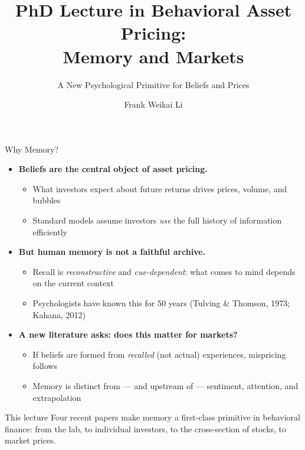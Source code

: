 \documentclass[aspectratio=169, 11pt]{beamer}
\title[EF8083 Lecture 6]{PhD Lecture in Behavioral Asset Pricing:\\ Memory and Markets}
\subtitle{A New Psychological Primitive for Beliefs and Prices}
\author[F.\ W.\ Li]{Frank Weikai Li}
\institute[CityU]{Associate Professor of Finance\\City University of Hong Kong}
\date{}
\begin{document}

\begin{frame}[plain]
\titlepage
\end{frame}

\begin{frame}{Why Memory?}
\begin{itemize}
\item \textbf{Beliefs are the central object of asset pricing.}
  \begin{itemize}
  \item What investors expect about future returns drives prices, volume, and bubbles
  \item Standard models assume investors \emph{use} the full history of information efficiently
  \end{itemize}
\item \textbf{But human memory is not a faithful archive.}
  \begin{itemize}
  \item Recall is \emph{reconstructive} and \emph{cue-dependent}: what comes to mind depends on the current context
  \item Psychologists have known this for 50 years (Tulving \& Thomson, 1973; Kahana, 2012)
  \end{itemize}
\item \textbf{A new literature asks: does this matter for markets?}
  \begin{itemize}
  \item If beliefs are formed from \emph{recalled} (not actual) experiences, mispricing follows
  \item Memory is distinct from --- and upstream of --- sentiment, attention, and extrapolation
  \end{itemize}
\end{itemize}
\vfill
\begin{block}{This lecture}
Four recent papers make memory a first-class primitive in behavioral finance: from the lab, to individual investors, to the cross-section of stocks, to market prices.
\end{block}
\end{frame}
\end{document}
